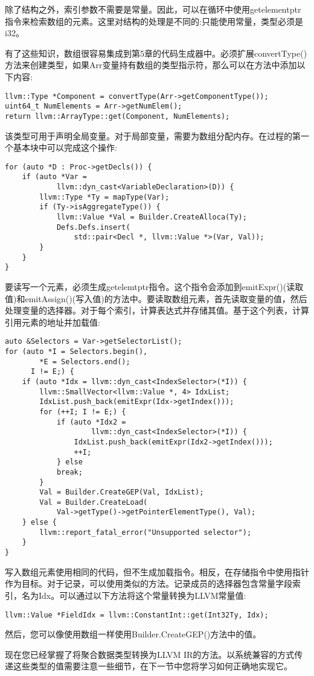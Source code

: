 除了结构之外，索引参数不需要是常量。因此，可以在循环中使用getelementptr指令来检索数组的元素。这里对结构的处理是不同的:只能使用常量，类型必须是i32。\par

有了这些知识，数组很容易集成到第5章的代码生成器中。必须扩展convertType()方法来创建类型，如果Arr变量持有数组的类型指示符，那么可以在方法中添加以下内容:\par

\begin{lstlisting}[caption={}]
llvm::Type *Component = convertType(Arr->getComponentType());
uint64_t NumElements = Arr->getNumElem();
return llvm::ArrayType::get(Component, NumElements);
\end{lstlisting}

该类型可用于声明全局变量。对于局部变量，需要为数组分配内存。在过程的第一个基本块中可以完成这个操作:\par

\begin{lstlisting}[caption={}]
for (auto *D : Proc->getDecls()) {
	if (auto *Var =
			llvm::dyn_cast<VariableDeclaration>(D)) {
		llvm::Type *Ty = mapType(Var);
		if (Ty->isAggregateType()) {
			llvm::Value *Val = Builder.CreateAlloca(Ty);
			Defs.Defs.insert(
				std::pair<Decl *, llvm::Value *>(Var, Val));
		}
	}
}
\end{lstlisting}

要读写一个元素，必须生成getelemtptr指令。这个指令会添加到emitExpr()(读取值)和emitAssign()(写入值)的方法中。要读取数组元素，首先读取变量的值，然后处理变量的选择器。对于每个索引，计算表达式并存储其值。基于这个列表，计算引用元素的地址并加载值:\par

\begin{lstlisting}[caption={}]
auto &Selectors = Var->getSelectorList();
for (auto *I = Selectors.begin(),
		*E = Selectors.end();
  	  I != E;) {
	if (auto *Idx = llvm::dyn_cast<IndexSelector>(*I)) {
		llvm::SmallVector<llvm::Value *, 4> IdxList;
		IdxList.push_back(emitExpr(Idx->getIndex()));
		for (++I; I != E;) {
			if (auto *Idx2 =
					llvm::dyn_cast<IndexSelector>(*I)) {
				IdxList.push_back(emitExpr(Idx2->getIndex()));
				++I;
			} else
			break;
		}
		Val = Builder.CreateGEP(Val, IdxList);
		Val = Builder.CreateLoad(
			Val->getType()->getPointerElementType(), Val);
	} else {
		llvm::report_fatal_error("Unsupported selector");
	}
}
\end{lstlisting}

写入数组元素使用相同的代码，但不生成加载指令。相反，在存储指令中使用指针作为目标。对于记录，可以使用类似的方法。记录成员的选择器包含常量字段索引，名为Idx。可以通过以下方法将这个常量转换为LLVM常量值:\par

\begin{lstlisting}[caption={}]
llvm::Value *FieldIdx = llvm::ConstantInt::get(Int32Ty, Idx);
\end{lstlisting}

然后，您可以像使用数组一样使用Builder.CreateGEP()方法中的值。\par

现在您已经掌握了将聚合数据类型转换为LLVM IR的方法。以系统兼容的方式传递这些类型的值需要注意一些细节，在下一节中您将学习如何正确地实现它。\par













